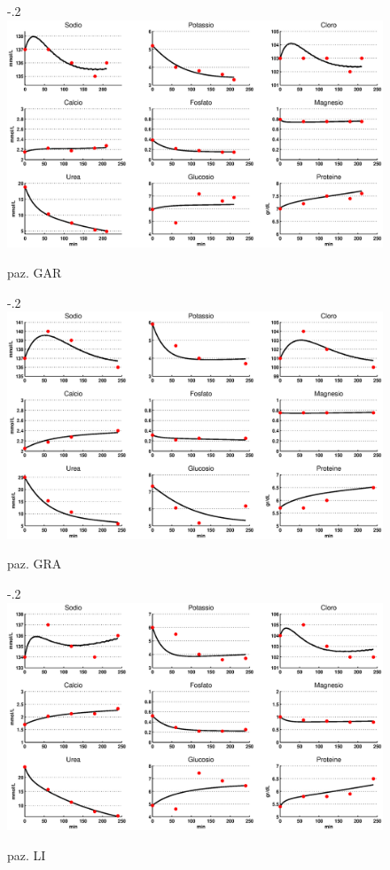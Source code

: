\begin{figure}[htb]
	\centering
	\advance\leftskip-.2\textwidth
		\includegraphics[width=1.4\textwidth]{immagini/garcal.eps}
		\caption{paz. GAR}		
\end{figure}
\begin{figure}[htb]
	\centering
		\advance\leftskip-.2\textwidth
		\includegraphics[width=1.4\textwidth]{immagini/gracal.eps}
		\caption{paz. GRA}		
\end{figure}
\begin{figure}[htb]
	\centering
		\advance\leftskip-.2\textwidth
		\includegraphics[width=1.4\textwidth]{immagini/lical.eps}
		\caption{paz. LI}		
\end{figure}
